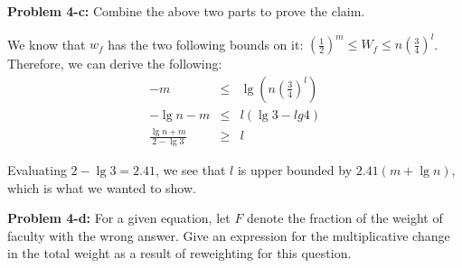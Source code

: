 \documentclass[psamsfonts]{amsart}
\newenvironment{sol}{\vspace{0.25cm}{\large \bfseries Solution:}}{\qedsymbol}
\newenvironment{prob}[1]{\begin{framed}{\large \bfseries Problem #1:}}{\end{framed}}
\begin{document}
\begin{prob}{4-c}
Combine the above two parts to prove the claim.
\end{prob}
\begin{sol}
We know that $w_f$ has the two following bounds on it: $\left( \frac{1}{2} \right)^m \leq W_f \leq n \left( \frac{3}{4} \right)^l$. Therefore, we can derive the following:
\begin{eqnarray}
-m &\leq& \lg \left( n \left( \frac{3}{4} \right)^l \right) \\
-\lg n - m &\leq& l (\lg 3 - lg 4) \\
\frac{\lg n + m}{2 - \lg 3} &\geq& l
\end{eqnarray}

Evaluating $2 - \lg 3 = 2.41$, we see that $l$ is upper bounded by $2.41(m + \lg n)$, which is what we wanted to show.
\end{sol}

\begin{prob}{4-d}
For a given equation, let $F$ denote the fraction of the weight of faculty with the wrong answer. Give an expression for the multiplicative change in the total weight as a result of reweighting for this question.
\end{prob}

\begin{sol}

\end{sol}
\end{document}
